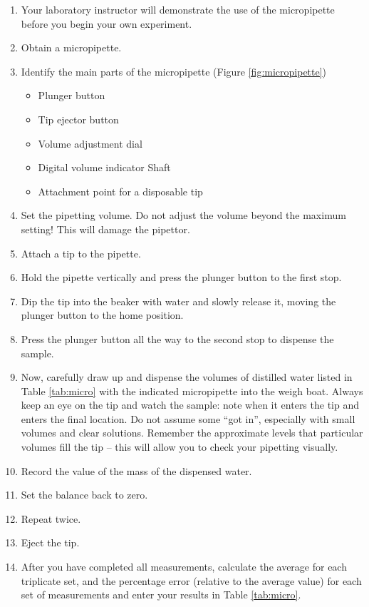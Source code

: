 \documentclass[]{book}
\providecommand{\tightlist}{%
  \setlength{\itemsep}{0pt}\setlength{\parskip}{0pt}}
\begin{document}
\begin{enumerate}
\def\labelenumi{\arabic{enumi}.}
\tightlist
\item
  Your laboratory instructor will demonstrate the use of the micropipette before you begin your own experiment.
\item
  Obtain a micropipette.
\item
  Identify the main parts of the micropipette (Figure \ref{fig:micropipette})

  \begin{itemize}
  \tightlist
  \item
    Plunger button
  \item
    Tip ejector button
  \item
    Volume adjustment dial
  \item
    Digital volume indicator
    Shaft
  \item
    Attachment point for a disposable tip
  \end{itemize}
\item
  Set the pipetting volume. Do not adjust the volume beyond the maximum setting! This will damage the pipettor.
\item
  Attach a tip to the pipette.
\item
  Hold the pipette vertically and press the plunger button to the first stop.
\item
  Dip the tip into the beaker with water and slowly release it, moving the plunger button to the home position.
\item
  Press the plunger button all the way to the second stop to dispense the sample.
\item
  Now, carefully draw up and dispense the volumes of distilled water listed in Table \ref{tab:micro} with the indicated micropipette into the weigh boat. Always keep an eye on the tip and watch the sample: note when it enters the tip and enters the final location. Do not assume some ``got in'', especially with small volumes and clear solutions. Remember the approximate levels that particular volumes fill the tip -- this will allow you to check your pipetting visually.
\item
  Record the value of the mass of the dispensed water.
\item
  Set the balance back to zero.
\item
  Repeat twice.
\item
  Eject the tip.
\item
  After you have completed all measurements, calculate the average for each triplicate set, and the percentage error (relative to the average value) for each set of measurements and enter your results in Table \ref{tab:micro}.
\end{enumerate}
\end{document}
